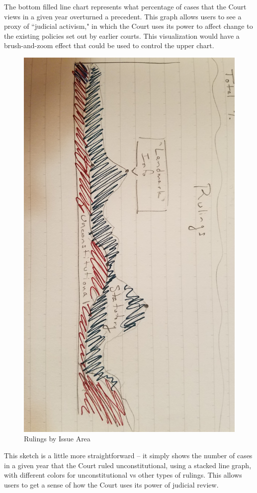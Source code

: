 \documentclass{article}
\begin{document}
The bottom filled line chart represents what percentage of cases that the Court views in a given year overturned a precedent.  This graph allows users to see a proxy of ``judicial activism," in which the Court uses its power to affect change to the existing policies set out by earlier courts.  This visualization would have a brush-and-zoom effect that could be used to control the upper chart.

\begin{figure}[h!]
    \includegraphics[width=\linewidth]{pics/Rulings.jpg}
    \caption{Rulings by Issue Area}
    \label{fig:roughrulings}
\end{figure}
\FloatBarrier
This sketch is a little more straightforward -- it simply shows the number of cases in a given year that the Court ruled unconstitutional, using a stacked line graph, with different colors for unconstitutional vs other types of rulings.  This allows users to get a sense of how the Court uses its power of judicial review.\\
\end{document}
